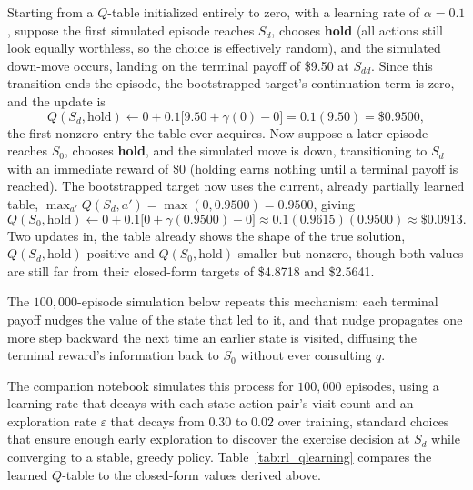 \documentclass[../ai_in_finance]{subfiles}
\begin{document}
Starting from a $Q$-table initialized entirely to zero, with a learning rate of $\alpha=0.1$, suppose the first simulated episode reaches $S_d$, chooses \textbf{hold} (all actions still look equally worthless, so the choice is effectively random), and the simulated down-move occurs, landing on the terminal payoff of \$9.50 at $S_{dd}$. Since this transition ends the episode, the bootstrapped target's continuation term is zero, and the update is
\begin{equation*}
Q(S_d,\text{hold}) \leftarrow 0 + 0.1\big[9.50 + \gamma(0) - 0\big] = 0.1(9.50) = \$0.9500,
\end{equation*}
the first nonzero entry the table ever acquires. Now suppose a later episode reaches $S_0$, chooses \textbf{hold}, and the simulated move is down, transitioning to $S_d$ with an immediate reward of \$0 (holding earns nothing until a terminal payoff is reached). The bootstrapped target now uses the current, already partially learned table, $\max_{a'}Q(S_d,a') = \max(0, 0.9500) = 0.9500$, giving
\begin{equation*}
Q(S_0,\text{hold}) \leftarrow 0 + 0.1\big[0 + \gamma(0.9500) - 0\big] \approx 0.1(0.9615)(0.9500) \approx \$0.0913.
\end{equation*}
Two updates in, the table already shows the shape of the true solution, $Q(S_d,\text{hold})$ positive and $Q(S_0,\text{hold})$ smaller but nonzero, though both values are still far from their closed-form targets of \$4.8718 and \$2.5641.

The $100{,}000$-episode simulation below repeats this mechanism: each terminal payoff nudges the value of the state that led to it, and that nudge propagates one more step backward the next time an earlier state is visited, diffusing the terminal reward's information back to $S_0$ without ever consulting $q$.

The companion notebook simulates this process for $100{,}000$ episodes, using a learning rate that decays with each state-action pair's visit count and an exploration rate $\varepsilon$ that decays from $0.30$ to $0.02$ over training, standard choices that ensure enough early exploration to discover the exercise decision at $S_d$ while converging to a stable, greedy policy. Table~\ref{tab:rl_qlearning} compares the learned $Q$-table to the closed-form values derived above.
\end{document}
